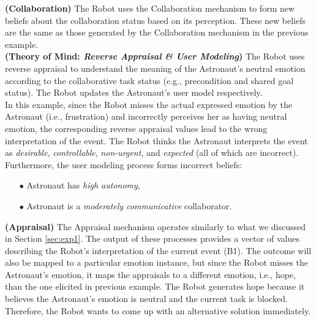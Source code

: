 \noindent\textbf{(Collaboration)} The Robot uses the Collaboration mechanism to
form new beliefs about the collaboration status based on its perception. These
new beliefs are the same as those generated by the Collaboration mechanism in
the previous example.\\

\noindent\textbf{(Theory of Mind: \textit{Reverse Appraisal \& User Modeling})}
The Robot uses reverse appraisal to understand the meaning of the Astronaut's
neutral emotion according to the collaborative task status (e.g., precondition
and shared goal status). The Robot updates the Astronaut's user model
respectively.\\

In this example, since the Robot misses the actual expressed emotion by the
Astronaut (i.e., frustration) and incorrectly perceives her as having neutral
emotion, the corresponding reverse appraisal values lead to the wrong
interpretation of the event. The Robot thinks the Astronaut interprets the
event as \textit{desirable}, \textit{controllable}, \textit{non-urgent}, and
\textit{expected} (all of which are incorrect). Furthermore, the user modeling
process forms incorrect beliefs:

\begin{itemize}
  \item[$\bullet$] Astronaut has \textit{high autonomy},
  \item[$\bullet$] Astronaut is a \textit{moderately communicative}
  collaborator.
\end{itemize}

\noindent\textbf{(Appraisal)} The Appraisal mechanism operates similarly to what
we discussed in Section \ref{sec:exp1}. The output of these processes provides a
vector of values describing the Robot's interpretation of the current event
(B1). The outcome will also be mapped to a particular emotion instance, but
since the Robot misses the Astronaut's emotion, it maps the appraisals to a
different emotion, i.e., hope, than the one elicited in previous example. The
Robot generates hope because it believes the Astronaut's emotion is neutral and
the current task is blocked. Therefore, the Robot wants to come up with an
alternative solution immediately.\\

